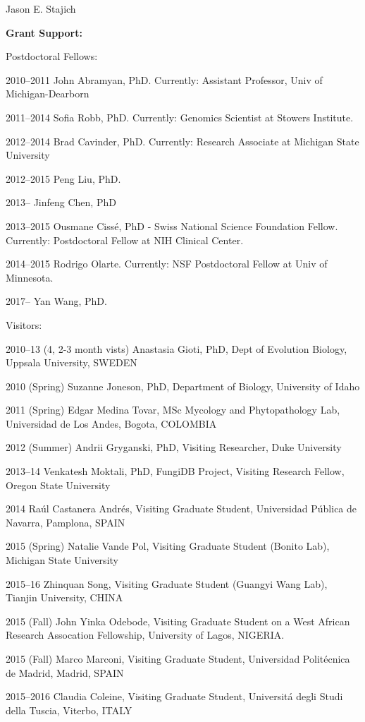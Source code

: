\documentclass[10pt]{article}
\begin{document}
\begin{cv}{\centerline{Jason E. Stajich}}
\begin{cvlistcompact}{\bf Grant Support:}
\begin{cvlistcompact}{Postdoctoral Fellows:}
\item [2010--2011] John Abramyan, PhD. Currently: Assistant Professor, Univ of Michigan-Dearborn
\item [2011--2014] Sofia Robb, PhD. Currently: Genomics Scientist at
  Stowers Institute.
\item [2012--2014] Brad Cavinder, PhD. Currently: Research Associate at Michigan
  State University
\item [2012--2015] Peng Liu, PhD. 
\item [2013--] Jinfeng Chen, PhD
\item [2013--2015] Ousmane Ciss\'{e}, PhD - Swiss National Science
  Foundation Fellow. Currently: Postdoctoral Fellow at NIH Clinical Center.
\item [2014--2015] Rodrigo Olarte. Currently: NSF Postdoctoral Fellow
  at Univ of Minnesota.
\item [2017--] Yan Wang, PhD.
\end{cvlistcompact}

\begin{cvlistcompact}{Visitors:}
\item [2010--13 (4, 2-3 month vists)] Anastasia Gioti, PhD,
  Dept of Evolution Biology, Uppsala University, SWEDEN
\item [2010 (Spring)] Suzanne Joneson, PhD, Department of Biology, University of Idaho
\item [2011 (Spring)] Edgar Medina Tovar, MSc
  Mycology and Phytopathology Lab, Universidad de Los Andes, Bogota, COLOMBIA
\item [2012 (Summer)] Andrii Gryganski, PhD, Visiting Researcher, Duke University 
\item [2013--14] Venkatesh Moktali, PhD,
  FungiDB Project, Visiting Research Fellow, Oregon State University
\item [2014] Ra\'{u}l Castanera Andr\'{e}s, Visiting Graduate Student,
  Universidad P\'{u}blica de Navarra, Pamplona, SPAIN
\item [2015 (Spring)] Natalie Vande Pol, Visiting Graduate Student (Bonito Lab), Michigan State University
\item [2015--16] Zhinquan Song, Visiting Graduate Student (Guangyi
  Wang Lab), Tianjin University, CHINA
\item [2015 (Fall)] John Yinka Odebode, Visiting Graduate Student on a West
  African Research Assocation Fellowship, University of Lagos, NIGERIA.
\item [2015 (Fall)] Marco Marconi, Visiting Graduate Student,
    Universidad Polit\'{e}cnica de Madrid, Madrid, SPAIN
\item [2015--2016] Claudia Coleine, Visiting Graduate Student,
    Universit\'{a} degli Studi della Tuscia, Viterbo, ITALY
\end{cvlistcompact}


\end{cvlistcompact}
\end{cv}
\end{document}
